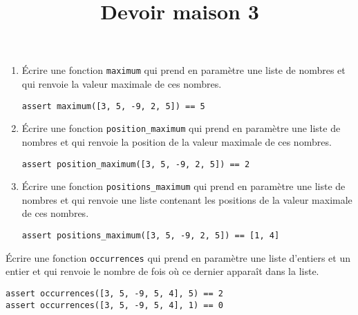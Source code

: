 \documentclass[a4paper,dvipsnames]{article}
\title{Devoir maison 3}
\author{}
\date{}
\begin{document}
\renewcommand{\contentsname}{}

\pagestyle{fancy}

\begin{tcolorbox}[colframe=blue!75, colback=blue!45, valign=center, height=1.5cm, top=5mm]
  \maketitle
\end{tcolorbox}


\vspace{1cm}

\thispagestyle{fancy}

\begin{exercice}{}{}
  \begin{enumerate}
    \item Écrire une fonction \texttt{maximum} qui prend en paramètre une liste de nombres et qui renvoie la valeur maximale de ces nombres.

      \begin{verbatim}
assert maximum([3, 5, -9, 2, 5]) == 5
      \end{verbatim}

    \item Écrire une fonction \texttt{position_maximum} qui prend en paramètre une liste de nombres et qui renvoie la position de la valeur maximale de ces nombres.

      \begin{verbatim}
assert position_maximum([3, 5, -9, 2, 5]) == 2
      \end{verbatim}

    \item Écrire une fonction \texttt{positions_maximum} qui prend en paramètre une liste de nombres et qui renvoie une liste contenant les positions de la valeur maximale de ces nombres.

      \begin{verbatim}
assert positions_maximum([3, 5, -9, 2, 5]) == [1, 4]
      \end{verbatim}
  \end{enumerate}
\end{exercice}

\medskip

\begin{exercice}{}{}
  Écrire une fonction \texttt{occurrences} qui prend en paramètre une liste d'entiers et un entier et qui renvoie le nombre de fois où ce dernier apparaît dans la liste.

      \begin{verbatim}
assert occurrences([3, 5, -9, 5, 4], 5) == 2
assert occurrences([3, 5, -9, 5, 4], 1) == 0
      \end{verbatim}

\end{exercice}
\end{document}
